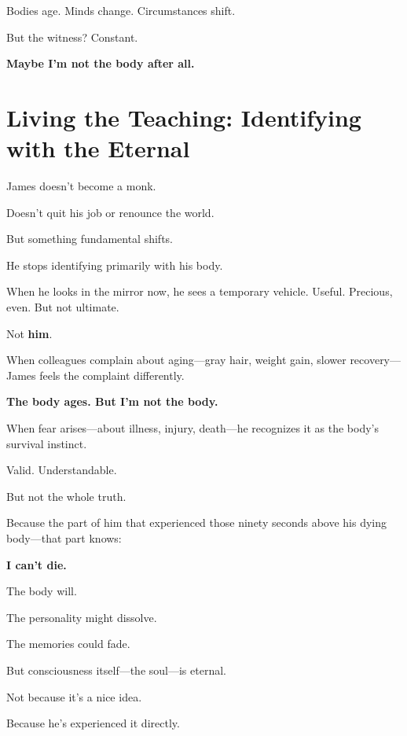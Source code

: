 \documentclass[11pt,twoside]{book}
\begin{document}
Bodies age. Minds change. Circumstances shift.

But the witness? Constant.

\textbf{Maybe I'm not the body after all.}

\section*{Living the Teaching: Identifying with the Eternal}

James doesn't become a monk.

Doesn't quit his job or renounce the world.

But something fundamental shifts.

He stops identifying primarily with his body.

When he looks in the mirror now, he sees a temporary vehicle. Useful. Precious, even. But not ultimate.

Not \textbf{him}.

When colleagues complain about aging—gray hair, weight gain, slower recovery—James feels the complaint differently.

\textbf{The body ages. But I'm not the body.}

When fear arises—about illness, injury, death—he recognizes it as the body's survival instinct.

Valid. Understandable.

But not the whole truth.

Because the part of him that experienced those ninety seconds above his dying body—that part knows:

\textbf{I can't die.}

The body will.

The personality might dissolve.

The memories could fade.

But consciousness itself—the soul—is eternal.

Not because it's a nice idea.

Because he's experienced it directly.
\end{document}
